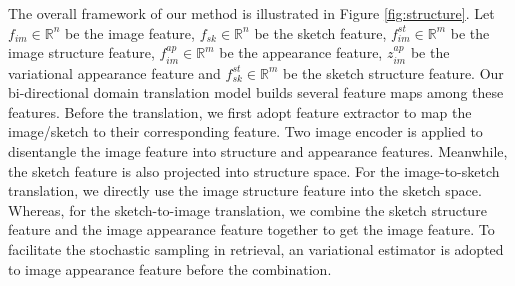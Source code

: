 \documentclass[10pt,twocolumn,letterpaper]{article}
\begin{document}

The overall framework of our method is illustrated in Figure \ref{fig:structure}.
Let $f_{im} \in \mathbb{R}^n$ be the image feature, $f_{sk} \in \mathbb{R}^n$ be the sketch feature, $f^{st}_{im} \in \mathbb{R}^m$ be the image structure feature, $f^{ap}_{im} \in \mathbb{R}^m$ be the appearance feature, $z^{ap}_{im}$ be the variational appearance feature and $f^{st}_{sk} \in \mathbb{R}^m$ be the sketch structure feature. 
Our bi-directional domain translation model builds several feature maps among these features. Before the translation, we first adopt feature extractor to map the image/sketch to their corresponding feature. Two image encoder is applied to disentangle the image feature into structure and appearance features. Meanwhile, the sketch feature is also projected into structure space. For the image-to-sketch translation, we directly use the image structure feature into the sketch space. Whereas, for the sketch-to-image translation, we combine the sketch structure feature and the image appearance feature together to get the image feature. To facilitate the stochastic sampling in retrieval, an variational estimator is adopted to image appearance feature before the combination.
\end{document}
